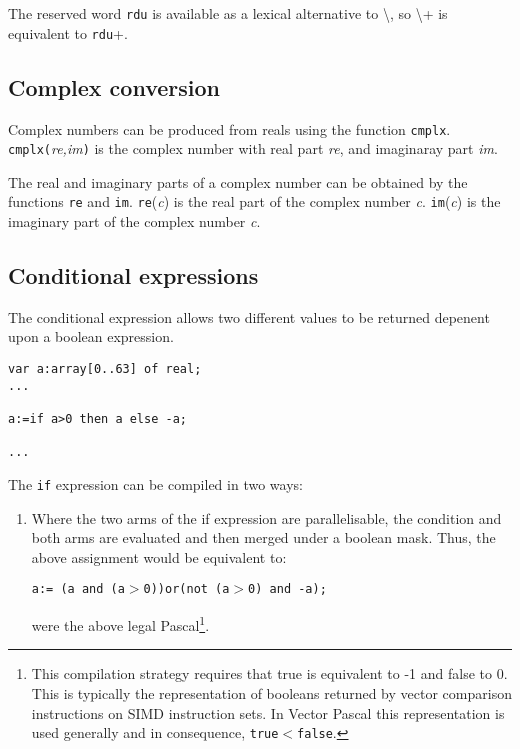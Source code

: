 {The reserved word \texttt{rdu} is available as a lexical alternative
to \textbackslash{}, so \textbackslash{}+ is equivalent to \texttt{rdu}+.


\subsection{Complex conversion}

Complex numbers can be produced from reals using the function
\texttt{cmplx}. \texttt{cmplx(}\emph{re,im}\texttt{)} is the complex
number with real part \emph{re}, and imaginaray part \emph{im}.

The real and imaginary parts of a complex number can be obtained by the functions
\texttt{re} and \texttt{im}. \texttt{re}(\emph{c}) is the real part of the complex
number \emph{c}. \texttt{im}(\emph{c}) is the imaginary part of the complex
number \emph{c}.


\subsection{Conditional expressions}

The conditional expression allows two different values to be returned depenent
upon a boolean expression.

\begin{verbatim}
var a:array[0..63] of real;
... 

a:=if a>0 then a else -a; 

...
\end{verbatim}

The \texttt{if} expression can be compiled in two ways: 

\begin{enumerate}
\item Where the two arms of the if expression are parallelisable, the condition and
both arms are evaluated and then merged under a boolean mask. Thus, the above
assignment would be equivalent to: 


\texttt{a:= (a and (a$ > $0))or(not (a$ > $0) and -a);}

were the above legal Pascal\footnote{%
This compilation strategy requires that true is equivalent to -1 and false to
0. This is typically the representation of booleans returned by vector comparison
instructions on SIMD instruction sets. In Vector Pascal this representation
is used generally and in consequence, \texttt{true}$ < $\texttt{false}.
}. 


\end{enumerate}}
